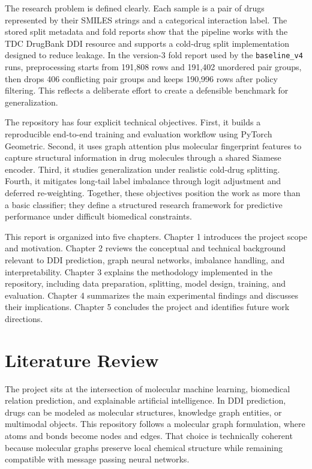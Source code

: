 \documentclass[12pt,a4paper]{report}
\begin{document}
The research problem is defined clearly. Each sample is a pair of drugs represented by their SMILES strings and a categorical interaction label. The stored split metadata and fold reports show that the pipeline works with the TDC DrugBank DDI resource and supports a cold-drug split implementation designed to reduce leakage. In the version-3 fold report used by the \texttt{baseline\_v4} runs, preprocessing starts from 191{,}808 rows and 191{,}402 unordered pair groups, then drops 406 conflicting pair groups and keeps 190{,}996 rows after policy filtering. This reflects a deliberate effort to create a defensible benchmark for generalization.

The repository has four explicit technical objectives. First, it builds a reproducible end-to-end training and evaluation workflow using PyTorch Geometric. Second, it uses graph attention plus molecular fingerprint features to capture structural information in drug molecules through a shared Siamese encoder. Third, it studies generalization under realistic cold-drug splitting. Fourth, it mitigates long-tail label imbalance through logit adjustment and deferred re-weighting. Together, these objectives position the work as more than a basic classifier; they define a structured research framework for predictive performance under difficult biomedical constraints.

This report is organized into five chapters. Chapter 1 introduces the project scope and motivation. Chapter 2 reviews the conceptual and technical background relevant to DDI prediction, graph neural networks, imbalance handling, and interpretability. Chapter 3 explains the methodology implemented in the repository, including data preparation, splitting, model design, training, and evaluation. Chapter 4 summarizes the main experimental findings and discusses their implications. Chapter 5 concludes the project and identifies future work directions.

\chapter{Literature Review}
The project sits at the intersection of molecular machine learning, biomedical relation prediction, and explainable artificial intelligence. In DDI prediction, drugs can be modeled as molecular structures, knowledge graph entities, or multimodal objects. This repository follows a molecular graph formulation, where atoms and bonds become nodes and edges. That choice is technically coherent because molecular graphs preserve local chemical structure while remaining compatible with message passing neural networks.
\end{document}

